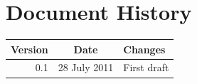 \section*{Document History}
\begin{tabular}{|r|c|l|}
	\hline
	\textbf{Version} & \textbf{Date} & \textbf{Changes} \\
	\hline
	0.1 & 28 July 2011 & First draft \\
	\hline
\end{tabular}

\clearpage


\pagestyle{plain}
\tableofcontents
\clearpage